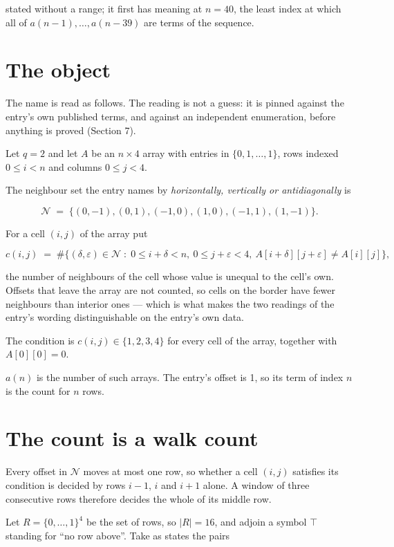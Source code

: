 \documentclass[11pt]{article}
\theoremstyle{definition}
\begin{document}
stated without a range; it first has meaning at $n = 40$, the least index at which all of $a(n-1),\dots,a(n-39)$ are terms of the sequence.

\section{The object}

The name is read as follows. The reading is not a guess: it is pinned against the entry's own published terms, and against an independent enumeration, before anything is proved (Section 7).

Let $q = 2$ and let $A$ be an $n \times 4$ array with entries in $\{0,1,\dots,1\}$, rows indexed $0 \le i < n$ and columns $0 \le j < 4$.

The neighbour set the entry names by {\itshape horizontally, vertically or antidiagonally} is

\[\mathcal{N} \;=\; \{(0,-1), (0,1), (-1,0), (1,0), (-1,1), (1,-1)\}.\]

For a cell $(i,j)$ of the array put

\[c(i,j) \;=\; \#\bigl\{(\delta,\varepsilon)\in\mathcal{N} \;:\; 0\le i+\delta<n,\ 0\le j+\varepsilon<4,\ A[i+\delta][j+\varepsilon] \neq A[i][j]\bigr\},\]

the number of neighbours of the cell whose value is unequal to the cell's own. Offsets that leave the array are not counted, so cells on the border have fewer neighbours than interior ones --- which is what makes the two readings of the entry's wording distinguishable on the entry's own data.

The condition is $c(i,j) \in \{1, 2, 3, 4\}$ for every cell of the array, together with $A[0][0]=0$.

$a(n)$ is the number of such arrays. The entry's offset is 1, so its term of index $n$ is the count for $n$ rows.

\section{The count is a walk count}

Every offset in $\mathcal{N}$ moves at most one row, so whether a cell $(i,j)$ satisfies its condition is decided by rows $i-1$, $i$ and $i+1$ alone. A window of three consecutive rows therefore decides the whole of its middle row.

Let $R = \{0,\dots,1\}^{4}$ be the set of rows, so $|R| = 16$, and adjoin a symbol $\top$ standing for ``no row above''. Take as states the pairs
\end{document}
